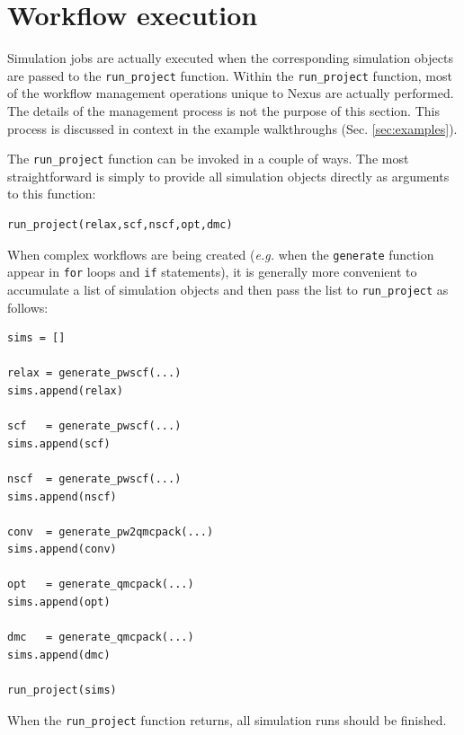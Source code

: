 \documentclass[oneside,11pt]{memoir}
\numberwithin{equation}{section}
\begin{document}
\section{Workflow execution}\label{sec:user_execution}
Simulation jobs are actually executed when the corresponding simulation objects are passed to the \texttt{run\_project} function.  Within the \texttt{run\_project} function, most of the workflow management operations unique to Nexus are actually performed.  The details of the management process is not the purpose of this section.  This process is discussed in context in the example walkthroughs (Sec. \ref{sec:examples}).

The \texttt{run\_project} function can be invoked in a couple of ways.  The most straightforward is simply to provide all simulation objects directly as arguments to this function:
\begin{verbatim}
run_project(relax,scf,nscf,opt,dmc)
\end{verbatim}

\noindent
When complex workflows are being created (\textit{e.g.} when the \texttt{generate} function appear in \texttt{for} loops and \texttt{if} statements), it is generally more convenient to accumulate a list of simulation objects and then pass the list to \texttt{run\_project} as follows:
\begin{verbatim}
sims = []

relax = generate_pwscf(...)
sims.append(relax)

scf   = generate_pwscf(...)
sims.append(scf)

nscf  = generate_pwscf(...)
sims.append(nscf)

conv  = generate_pw2qmcpack(...)
sims.append(conv)

opt   = generate_qmcpack(...)
sims.append(opt)

dmc   = generate_qmcpack(...)
sims.append(dmc)

run_project(sims)
\end{verbatim}

\noindent
When the \texttt{run\_project} function returns, all simulation runs should be finished.  
\end{document}
